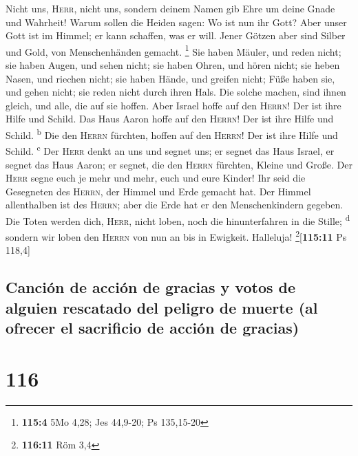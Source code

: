  Nicht uns, \textsc{Herr}, nicht uns, sondern deinem Namen
gib Ehre um deine Gnade und Wahrheit!  Warum sollen die
Heiden sagen: Wo ist nun ihr Gott?  Aber unser Gott ist im
Himmel; er kann schaffen, was er will.  Jener Götzen aber
sind Silber und Gold, von Menschenhänden gemacht. \footnote{\textbf{115:4}
  5Mo 4,28; Jes 44,9-20; Ps 135,15-20}  Sie haben Mäuler,
und reden nicht; sie haben Augen, und sehen nicht;  sie
haben Ohren, und hören nicht; sie heben Nasen, und riechen nicht;
 sie haben Hände, und greifen nicht; Füße haben sie, und
gehen nicht; sie reden nicht durch ihren Hals.  Die solche
machen, sind ihnen gleich, und alle, die auf sie hoffen. 
Aber Israel hoffe auf den \textsc{Herrn}! Der ist ihre Hilfe und Schild.
 Das Haus Aaron hoffe auf den \textsc{Herrn}! Der ist
ihre Hilfe und Schild. \textsuperscript{b}  Die den
\textsc{Herrn} fürchten, hoffen auf den \textsc{Herrn}! Der ist ihre
Hilfe und Schild. \textsuperscript{c}  Der \textsc{Herr}
denkt an uns und segnet uns; er segnet das Haus Israel, er segnet das
Haus Aaron;  er segnet, die den \textsc{Herrn} fürchten,
Kleine und Große.  Der \textsc{Herr} segne euch je mehr
und mehr, euch und eure Kinder!  Ihr seid die Gesegneten
des \textsc{Herrn}, der Himmel und Erde gemacht hat.  Der
Himmel allenthalben ist des \textsc{Herrn}; aber die Erde hat er den
Menschenkindern gegeben.  Die Toten werden dich,
\textsc{Herr}, nicht loben, noch die hinunterfahren in die Stille;
\textsuperscript{d}  sondern wir loben den \textsc{Herrn}
von nun an bis in Ewigkeit. Halleluja! \footnote{\textbf{116:11} Röm 3,4}{[}\textbf{115:11}
Ps 118,4{]}

\hypertarget{canciuxf3n-de-acciuxf3n-de-gracias-y-votos-de-alguien-rescatado-del-peligro-de-muerte-al-ofrecer-el-sacrificio-de-acciuxf3n-de-gracias}{%
\subsection{Canción de acción de gracias y votos de alguien rescatado
del peligro de muerte (al ofrecer el sacrificio de acción de
gracias)}\label{canciuxf3n-de-acciuxf3n-de-gracias-y-votos-de-alguien-rescatado-del-peligro-de-muerte-al-ofrecer-el-sacrificio-de-acciuxf3n-de-gracias}}

\hypertarget{section-115}{%
\section{116}\label{section-115}}

